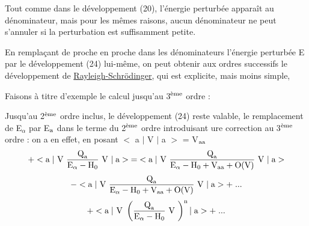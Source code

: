 Tout comme dans le développement (20), l'énergie perturbée apparaît au dénominateur, mais pour les mêmes raisons, aucun dénominateur ne peut s'annuler si la
perturbation est suffisamment petite.

En remplaçant de proche en proche dans les dénominateurs l'énergie
perturbée E par le développement (24) lui-même, on peut obtenir aux ordres
successifs le développement de \ul{Rayleigh-Schrödinger}, qui est explicite, mais
moins simple,

Faisons à titre d'exemple le calcul jusqu'au 3$^{\text{ème}}$ ordre :

Jusqu'au 2$^{\text{ème}}$ ordre inclus, le développement (24) reste valable, le
remplacement de E$_\alpha$ par E$_{\text{a}}$ dans le terme du 2$^{\text{ème}}$ ordre introduisant ure correction au 3$^{\text{ème}}$ ordre : on a en effet, en posant $<$ a $|$ V $|$ a $>$ = V$_{\text{aa}}$
\[
+<\text{a}\;|\text{ V }\frac{\text{Q}_{\text{a}}}{\text{E}_\alpha-\text{H}_0}\text{ V }|\;\text{a}>\;=\;
<\text{a}\;|\text{ V }\frac{\text{Q}_{\text{a}}}{\text{E}_\alpha-\text{H}_0+\text{V}_{\text{aa}}+\text{O(V)}}\text{ V }|\;\text{a}>
\]
\[
-<\text{a}\;|\text{ V }\frac{\text{Q}_{\text{a}}}{\text{E}_\alpha-\text{H}_0+\text{V}_{\text{aa}}+\text{O(V)}}\text{ V }|\;\text{a}>+\;...
\]
\[
+<\text{a}\;|\text{ V }\left(\frac{\text{Q}_{\text{a}}}{\text{E}_\alpha-\text{H}_0}\text{ V }\right)^{\text{n}}|\;\text{a}>+\;...
\]

